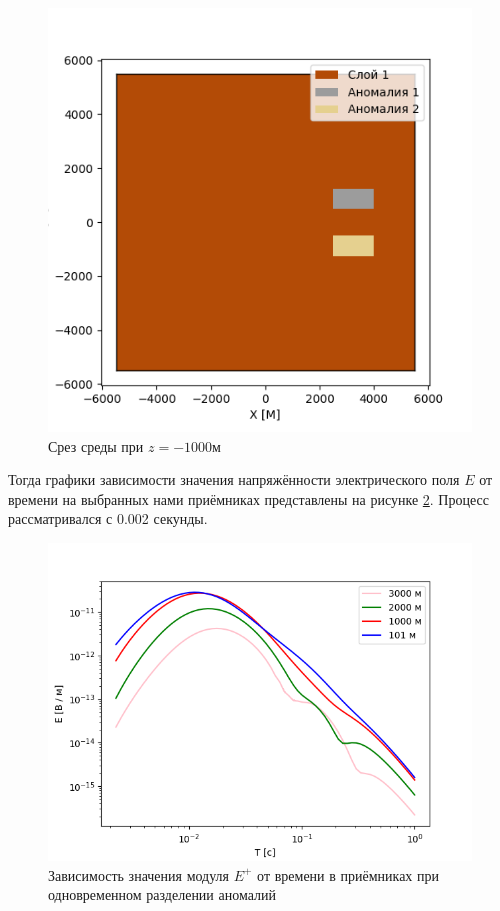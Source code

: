 \begin{figure}
	\centering
	\vspace*{0.7cm}
	\includegraphics[width=0.7\linewidth]{images/Anomalies_2.png}
	\caption{Срез среды при $z = -1000$м}
	\label{fig:Anomaly2}
\end{figure}

Тогда графики зависимости значения напряжённости электрического поля $E$ от времени на выбранных нами приёмниках представлены на рисунке \ref{fig:LogE_both}. Процесс рассматривался с 0.002 секунды. 

\begin{figure}
	\centering
	\vspace*{0.7cm}
	\includegraphics[width=1.0\linewidth]{images/Log_E_both.png}
	\caption{Зависимость значения модуля $E^+$ от времени в приёмниках при одновременном разделении аномалий}
	\label{fig:LogE_both}
\end{figure} 


